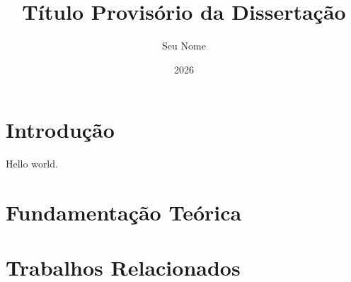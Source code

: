 \documentclass[12pt, a4paper]{report}
\title{Título Provisório da Dissertação}
\author{Seu Nome}
\date{2026}
\begin{document}
\maketitle

\tableofcontents

\chapter{Introdução}

Hello world.

\chapter{Fundamentação Teórica}

\chapter{Trabalhos Relacionados}



\end{document}
